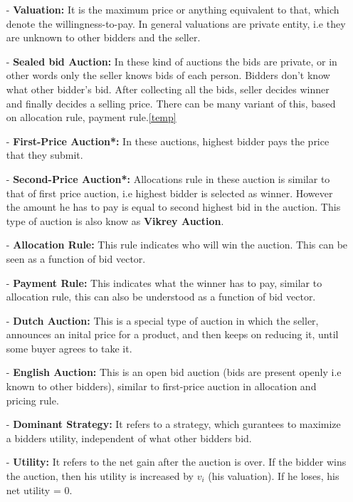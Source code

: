 \documentclass[a4paper]{article}
\begin{document}
\begin{itemize}
    \item[-] \textbf{Valuation:} It is the maximum price or anything equivalent to that, which denote the willingness-to-pay. 
    In general valuations are private entity, i.e they are unknown to other bidders and the seller.  


    \item[-] \textbf{Sealed bid Auction:} In these kind of auctions the bids are private, or in other words only the seller knows bids of each person.
    Bidders don't know what other bidder's bid.
    After collecting all the bids, seller decides winner and finally decides a selling price.
    There can be many variant of this, based on allocation rule, payment rule.\ref{temp}

    \item[-] \textbf{First-Price Auction*:} In these auctions, highest bidder pays the price that they submit. \label{temp}

    \item[-] \textbf{Second-Price Auction*:} Allocations rule in these auction is similar to that of first price auction, i.e highest bidder is selected as winner.
    However the amount he has to pay is equal to second highest bid in the auction.
    This type of auction is also know as \textbf{Vikrey Auction}.

    \item[-] \textbf{Allocation Rule:} This rule indicates who will win the auction.
    This can be seen as a function of bid vector.

    \item[-] \textbf{Payment Rule:} This indicates what the winner has to pay, similar to allocation rule, this can also be understood as a function of bid vector.

    \item[-] \textbf{Dutch Auction:} This is a special type of auction in which the seller, announces an inital price for a product, and then keeps on reducing it, until some buyer agrees to take it.

    \item[-] \textbf{English Auction:} This is an open bid auction (bids are present openly i.e known to other bidders), similar to first-price auction in allocation and pricing rule.

    \item[-] \textbf{Dominant Strategy:} It refers to a strategy, which gurantees to maximize a bidders utility, independent of what other bidders bid.

    \item[-] \textbf{Utility:} It refers to the net gain after the auction is over. If the bidder wins the auction, then his utility is increased by $v_i$ (his valuation). If he loses, his net utility = $0$.
\end{itemize}
\end{document}

